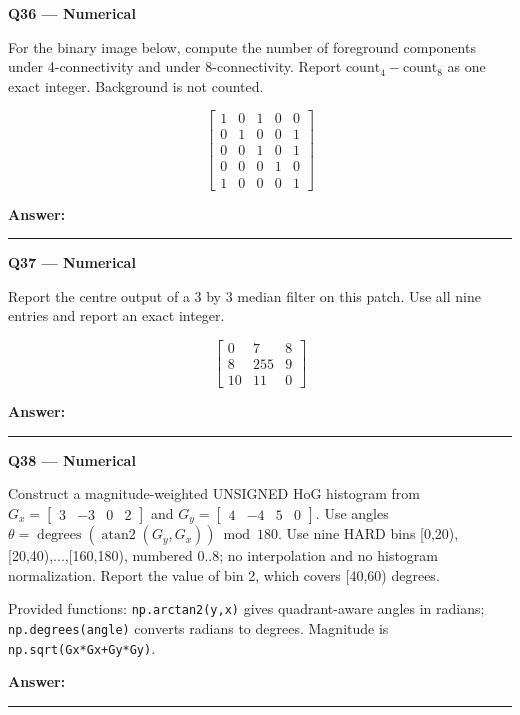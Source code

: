 \documentclass[11pt,a4paper]{article}
\begin{document}
\begin{minipage}{\linewidth}
\textbf{Q36 — Numerical}\par\smallskip
For the binary image below,\allowbreak{} compute the number of foreground components under 4-connectivity and under 8-connectivity. Report \(\text{count}_4-\text{count}_8\) as one exact integer. Background is not counted.


\[
\begin{bmatrix}1&0&1&0&0\\0&1&0&0&1\\0&0&1&0&1\\0&0&0&1&0\\1&0&0&0&1\end{bmatrix}
\]

\par\medskip\textbf{Answer:} \rule{55mm}{0.4pt}
\end{minipage}
\par\vspace{12pt}
\begin{minipage}{\linewidth}
\textbf{Q37 — Numerical}\par\smallskip
Report the centre output of a 3 by 3 median filter on this patch. Use all nine entries and report an exact integer.


\[
\begin{bmatrix}0&7&8\\8&255&9\\10&11&0\end{bmatrix}
\]

\par\medskip\textbf{Answer:} \rule{55mm}{0.4pt}
\end{minipage}
\par\vspace{12pt}
\begin{minipage}{\linewidth}
\textbf{Q38 — Numerical}\par\smallskip
Construct a magnitude-weighted UNSIGNED HoG histogram from \(G_x=\begin{bmatrix}3&-3&0&2\end{bmatrix}\) and \(G_y=\begin{bmatrix}4&-4&5&0\end{bmatrix}\). Use angles \(\theta=\operatorname{degrees}(\operatorname{atan2}(G_y,G_x))\bmod180\). Use nine HARD bins [0,\allowbreak{}20),\allowbreak{}[20,\allowbreak{}40),\allowbreak{}...,\allowbreak{}[160,\allowbreak{}180),\allowbreak{} numbered 0..8; no interpolation and no histogram normalization. Report the value of bin 2,\allowbreak{} which covers [40,\allowbreak{}60) degrees.

Provided functions: \texttt{np.arctan2(y,\allowbreak{}x)} gives quadrant-aware angles in radians; \texttt{np.degrees(angle)} converts radians to degrees. Magnitude is \texttt{np.sqrt(Gx*\allowbreak{}Gx+Gy*\allowbreak{}Gy)}.
\par\medskip\textbf{Answer:} \rule{55mm}{0.4pt}
\end{minipage}
\end{document}
